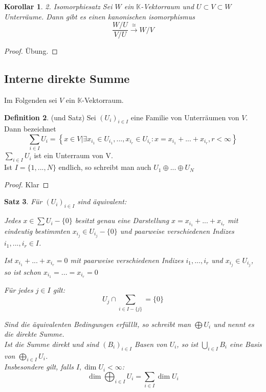 \documentclass[12pt,a4paper]{article}
\newtheorem{theorem}{Satz}
\newtheorem{corollary}[theorem]{Korollar}
\theoremstyle{definition}
\newtheorem{definition}[theorem]{Definition}
\theoremstyle{remark}
\begin{document}
	\begin{corollary}{2. Isomorphiesatz}
		Sei $W$ ein $\mathbb{K}$-Vektorraum und $U \subset V \subset W$ Unterräume. Dann gibt es einen kanonischen isomorphismus
		\begin{equation}
			\frac{W/U}{V/U} \xrightarrow{\cong} W/V
		\end{equation}
	\end{corollary}
	\begin{proof}
		Übung.
	\end{proof}
	
	\newpage	
	
	\subsection{Interne direkte Summe}
	Im Folgenden sei $V$ ein $\mathbb{K}$-Vektorraum.
	\begin{definition}{(und Satz)}
		Sei $(U_i)_{i \in I}$ eine Familie von Unterräumen von $V$. Dann bezeichnet
		\begin{equation}
			\sum\limits_{i \in I} U_i = \left\{ x \in V | \exists x_{i_1} \in U_{i_1},...,x_{i_r} \in U_{i_r}: x= x_{i_1}+...+x_{i_r}, r < \infty \right\}
		\end{equation}
		$\sum_{i \in I} U_i$ ist ein Unterraum von V. \\
		Ist $I = \{ 1,...,N \}$ endlich, so schreibt man auch $U_1 \oplus ... \oplus U_N$
	\end{definition}
	\begin{proof}
		Klar
	\end{proof}
	\begin{theorem}
		Für $(U_i)_{i \in I}$ sind äquivalent:
		\begin{proofenum}
			\item Jedes $x \in \sum U_i - \{ 0\}$ besitzt genau eine Darstellung $x = x_{i_1}+...+x_{i_r}$ mit eindeutig bestimmten $x_{i_j} \in U_{i_j} - \{ 0 \}$ und paarweise verschiedenen Indizes $i_1,...,i_r \in I$.
			\item
				Ist $x_{i_1}+...+x_{i_r}=0$ mit paarweise verschiedenen Indizes $i_1,...,i_r$ und $x_{i_j} \in U_{i_j}$, so ist schon $x_{i_1}=...=x_{i_r}=0$
			\item
				Für jedes $j \in I$ gilt:
				\begin{equation}
					U_j \cap \sum_{i \in I-\{ j\}}= \{0 \}
				\end{equation}
		\end{proofenum}
		Sind die äquivalenten Bedingungen erfülllt, so schreibt man $\bigoplus U_i$ und nennt es die direkte Summe. \\
		Ist die Summe direkt und sind $(B_i)_{i \in I}$ Basen von $U_i$, so ist $\bigcup_{i \in I} B_i$ eine Basis von $\bigoplus_{i \in I} U_i$. \\
		Insbesondere gilt, falls $I, \dim U_i < \infty$:
		\begin{equation}
			\dim \bigoplus_{i \in I} U_i = \sum_{i \in I} \dim U_i
		\end{equation}
	\end{theorem}
\end{document}

